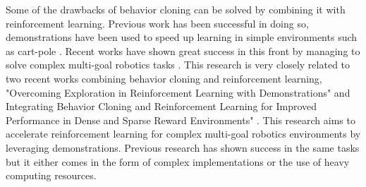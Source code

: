 Some of the drawbacks of behavior cloning can be solved by combining it with reinforcement learning. Previous work has been successful in doing so, demonstrations have been used to speed up learning in simple environments such as cart-pole \cite{RLFD}. Recent works have shown great success in this front by managing to solve complex multi-goal robotics tasks \cite{nair2018overcoming}. This research is very closely related to two recent works combining behavior cloning and reinforcement learning, "Overcoming Exploration in Reinforcement Learning with Demonstrations" \cite{nair2018overcoming} and Integrating Behavior Cloning and Reinforcement Learning for Improved Performance in Dense and Sparse Reward Environments" \cite{goecks2020integrating}. This research aims to accelerate reinforcement learning for complex multi-goal robotics environments by leveraging demonstrations. Previous research has shown success in the same tasks but it either comes in the form of complex implementations or the use of heavy computing resources. \\